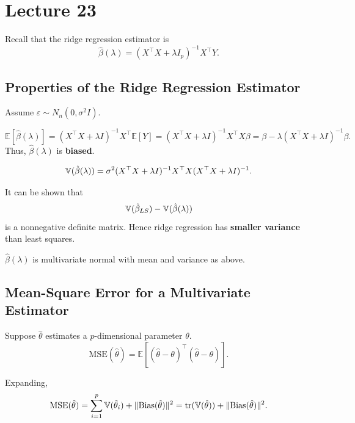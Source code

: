 \section{Lecture 23}

Recall that the ridge regression estimator is
\[
    \hat{\beta}(\lambda)
    = (X^{\top} X + \lambda I_p)^{-1} X^{\top} Y.
\]

\subsection{Properties of the Ridge Regression Estimator}

Assume $\varepsilon \sim N_n(0, \sigma^2 I)$.

\begin{result}
\[
    \mathbb{E}[\hat{\beta}(\lambda)]
    = (X^{\top} X + \lambda I)^{-1} X^{\top} \mathbb{E}[Y]
    = (X^{\top} X + \lambda I)^{-1} X^{\top} X \beta
    = \beta - \lambda (X^{\top} X + \lambda I)^{-1} \beta.
\]
Thus, $\hat{\beta}(\lambda)$ is \textbf{biased}.
\end{result}

\begin{result}
\[
    \mathbb{V}(\hat{\beta}(\lambda))
    = \sigma^2 (X^{\top} X + \lambda I)^{-1} X^{\top}
        X (X^{\top} X + \lambda I)^{-1}.
\]
\end{result}

\begin{result}
It can be shown that
\[
    \mathbb{V}(\hat{\beta}_{LS}) - \mathbb{V}(\hat{\beta}(\lambda))
\]
is a nonnegative definite matrix.  
Hence ridge regression has \textbf{smaller variance} than least squares.
\end{result}

\begin{result}
$\hat{\beta}(\lambda)$ is multivariate normal with mean and variance as above.
\end{result}

\subsection{Mean-Square Error for a Multivariate Estimator}

Suppose $\hat{\theta}$ estimates a $p$-dimensional parameter $\theta$.
\[
    \mathrm{MSE}(\hat{\theta})
    = \mathbb{E}[(\hat{\theta} - \theta)^{\top}(\hat{\theta} - \theta)].
\]

Expanding,
\[
    \mathrm{MSE}(\hat{\theta})
    = \sum_{i=1}^p \mathbb{V}(\hat{\theta}_i)
        + \|\mathrm{Bias}(\hat{\theta})\|^2
    = \operatorname{tr}(\mathbb{V}(\hat{\theta})) + \|\mathrm{Bias}(\hat{\theta})\|^2.
\]

